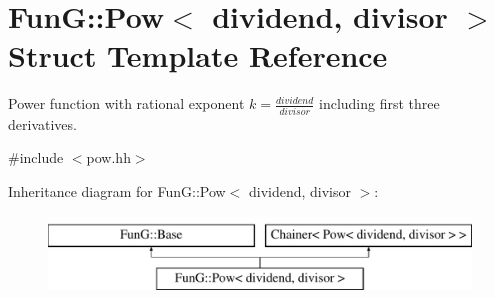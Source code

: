 \hypertarget{structFunG_1_1Pow}{\section{Fun\-G\-:\-:Pow$<$ dividend, divisor $>$ Struct Template Reference}
\label{structFunG_1_1Pow}
}


Power function with rational exponent $ k = \frac{dividend}{divisor} $ including first three derivatives.  




{\ttfamily \#include $<$pow.\-hh$>$}

Inheritance diagram for Fun\-G\-:\-:Pow$<$ dividend, divisor $>$\-:\begin{figure}[H]
\begin{center}
\leavevmode
\includegraphics[height=2.000000cm]{structFunG_1_1Pow}
\end{center}
\end{figure}
